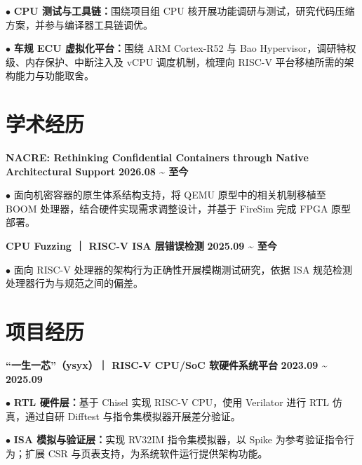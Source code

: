 \documentclass[11pt,a4paper,fontset=none]{ctexart}
\newcommand{\daterange}[1]{{\textbf{#1}}}
\newcommand{\entrytitle}[1]{{\textbf{#1}}}
\begin{document}
\par\noindent
$\bullet$ \textbf{CPU 测试与工具链：}围绕项目组 CPU 核开展功能调研与测试，研究代码压缩方案，并参与编译器工具链调优。

\par\noindent
$\bullet$ \textbf{车规 ECU 虚拟化平台：}围绕 ARM Cortex-R52 与 Bao Hypervisor，调研特权级、内存保护、中断注入及 vCPU 调度机制，梳理向 RISC-V 平台移植所需的架构能力与功能取舍。

\section*{学术经历}
\vspace{-0.1em}

\noindent
\entrytitle{NACRE: Rethinking Confidential Containers through Native Architectural Support}
\hfill \daterange{2026.08 \textasciitilde{} 至今}

\par\noindent
$\bullet$ 面向机密容器的原生体系结构支持，将 QEMU 原型中的相关机制移植至 BOOM 处理器，结合硬件实现需求调整设计，并基于 FireSim 完成 FPGA 原型部署。

\par{}
\noindent
\entrytitle{CPU Fuzzing ｜ RISC-V ISA 层错误检测}
\hfill \daterange{2025.09 \textasciitilde{} 至今}

\par\noindent
$\bullet$ 面向 RISC-V 处理器的架构行为正确性开展模糊测试研究，依据 ISA 规范检测处理器行为与规范之间的偏差。

\section*{项目经历}
\vspace{-0.1em}

\noindent
\entrytitle{“一生一芯”（ysyx）｜ RISC-V CPU/SoC 软硬件系统平台}
\hfill \daterange{2023.09 \textasciitilde{} 2025.09}

\par\noindent
$\bullet$ \textbf{RTL 硬件层：}基于 Chisel 实现 RISC-V CPU，使用 Verilator 进行 RTL 仿真，通过自研 Difftest 与指令集模拟器开展差分验证。

\par\noindent
$\bullet$ \textbf{ISA 模拟与验证层：}实现 RV32IM 指令集模拟器，以 Spike 为参考验证指令行为；扩展 CSR 与页表支持，为系统软件运行提供架构功能。
\end{document}
